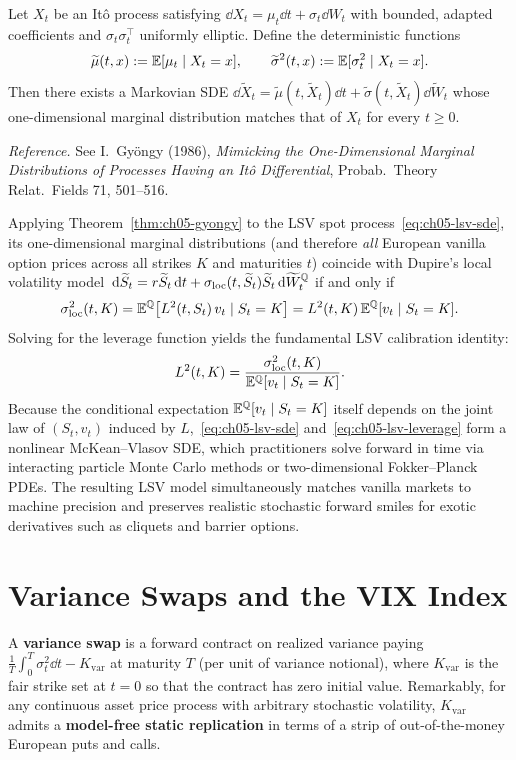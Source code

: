 \begin{theorem}
    \label{thm:ch05-gyongy}
    Let $X_t$ be an It\^o process satisfying $\dd X_t = \mu_t \dd t + \sigma_t \dd W_t$ with bounded, adapted coefficients and $\sigma_t\sigma_t^\top$ uniformly elliptic. Define the deterministic functions
    \[
        \widetilde{\mu}(t, x) := \mathbb{E}[\mu_t \mid X_t = x], \qquad
        \widetilde{\sigma}^2(t, x) := \mathbb{E}[\sigma_t^2 \mid X_t = x].
    \]
    Then there exists a Markovian SDE $\dd \widetilde{X}_t = \widetilde{\mu}(t, \widetilde{X}_t)\dd t + \widetilde{\sigma}(t, \widetilde{X}_t)\dd \widetilde{W}_t$ whose one-dimensional marginal distribution matches that of $X_t$ for every $t \ge 0$.
\end{theorem}
\noindent\emph{Reference.} See I.~Gy\"ongy (1986), \emph{Mimicking the One-Dimensional Marginal Distributions of Processes Having an It\^o Differential}, Probab.\ Theory Relat.\ Fields 71, 501--516.

Applying Theorem~\ref{thm:ch05-gyongy} to the LSV spot process~\eqref{eq:ch05-lsv-sde}, its one-dimensional marginal distributions (and therefore \emph{all} European vanilla option prices across all strikes $K$ and maturities $t$) coincide with Dupire's local volatility model $\,\mathrm{d} \widetilde{S}_t = r\widetilde{S}_t \,\mathrm{d} t + \sigma_{\mathrm{loc}}(t, \widetilde{S}_t)\widetilde{S}_t \,\mathrm{d} \widetilde{W}_t^{\mathbb{Q}}$ if and only if
\[
    \sigma_{\mathrm{loc}}^2(t, K)
    = \mathbb{E}^{\mathbb{Q}}\bigl[L^2(t, S_t)\,v_t \mid S_t = K\bigr]
    = L^2(t, K)\,\mathbb{E}^{\mathbb{Q}}[v_t \mid S_t = K].
\]
Solving for the leverage function yields the fundamental LSV calibration identity:
\begin{equation}
    \label{eq:ch05-lsv-leverage}
    L^2(t, K) = \frac{\sigma_{\mathrm{loc}}^2(t, K)}{\mathbb{E}^{\mathbb{Q}}[v_t \mid S_t = K]}.
\end{equation}
Because the conditional expectation $\mathbb{E}^{\mathbb{Q}}[v_t \mid S_t = K]$ itself depends on the joint law of $(S_t, v_t)$ induced by $L$,~\eqref{eq:ch05-lsv-sde} and~\eqref{eq:ch05-lsv-leverage} form a nonlinear McKean--Vlasov SDE, which practitioners solve forward in time via interacting particle Monte Carlo methods or two-dimensional Fokker--Planck PDEs. The resulting LSV model simultaneously matches vanilla markets to machine precision and preserves realistic stochastic forward smiles for exotic derivatives such as cliquets and barrier options.

\section{Variance Swaps and the VIX Index}
\label{sec:ch05-var-swaps}
A \textbf{variance swap} is a forward contract on realized variance paying $\frac{1}{T}\int_0^T \sigma_t^2 \dd t - K_{\mathrm{var}}$ at maturity $T$ (per unit of variance notional), where $K_{\mathrm{var}}$ is the fair strike set at $t = 0$ so that the contract has zero initial value. Remarkably, for any continuous asset price process with arbitrary stochastic volatility, $K_{\mathrm{var}}$ admits a \textbf{model-free static replication} in terms of a strip of out-of-the-money European puts and calls.

